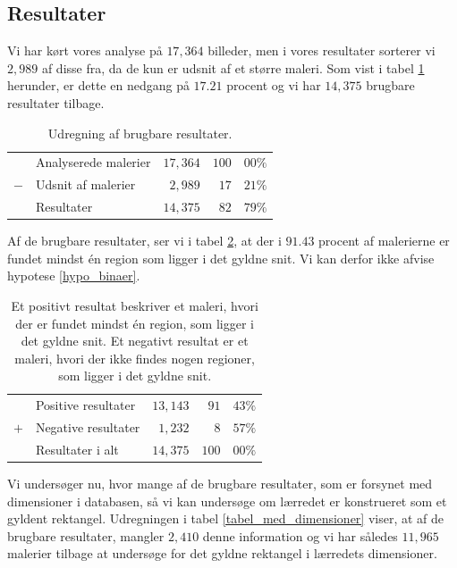 {\subsection{Resultater}
Vi har kørt vores analyse på $17,364$ billeder, men i vores resultater
sorterer vi $2,989$ af disse fra, da de kun er udsnit af et større maleri.
Som vist i tabel \ref{tabel_fjern_detaljer} herunder, er dette en nedgang
på $17.21$ procent og vi har $14,375$ brugbare resultater tilbage.

\begin{table}[H]
    \centering
    \begin{tabular}{r@{\ \ }p{12em}r|r@{.}l}
            & Analyserede malerier & $17,364$ & $100$ & $00\%$   \\
        $-$ & Udsnit af malerier   &  $2,989$ &  $17$ & $21\%$   \\\hline
            & Resultater           & $14,375$ &  $82$ & $79\%$
    \end{tabular}
    \caption[]{Udregning af brugbare resultater.}
    \label{tabel_fjern_detaljer}
\end{table}

Af de brugbare resultater, ser vi i tabel \ref{tabel_fordeling}, at der
i $91.43$ procent af malerierne er fundet mindst én region som ligger i
det gyldne snit. Vi kan derfor ikke afvise hypotese \ref{hypo_binaer}.

\begin{table}[H]
    \centering
    \begin{tabular}{r@{\ \ }p{12em}r|r@{.}l}
            & Positive resultater   & $13,143$ &  $91$ & $43\%$ \\
        $+$ & Negative resultater   &  $1,232$ &   $8$ & $57\%$ \\\hline
            & Resultater i alt      & $14,375$ & $100$ & $00\%$
    \end{tabular}
    \caption[]{Et positivt resultat beskriver et maleri, hvori der er
    fundet mindst én region, som ligger i det gyldne snit. Et negativt
    resultat er et maleri, hvori der ikke findes nogen regioner, som
    ligger i det gyldne snit.}
    \label{tabel_fordeling}
\end{table}

Vi undersøger nu, hvor mange af de brugbare resultater, som er forsynet
med dimensioner i databasen, så vi kan undersøge om lærredet er
konstrueret som et gyldent rektangel. Udregningen i tabel
\ref{tabel_med_dimensioner} viser, at af de brugbare resultater, mangler
$2,410$ denne information og vi har således $11,965$ malerier tilbage at
undersøge for det gyldne rektangel i lærredets dimensioner.

}
